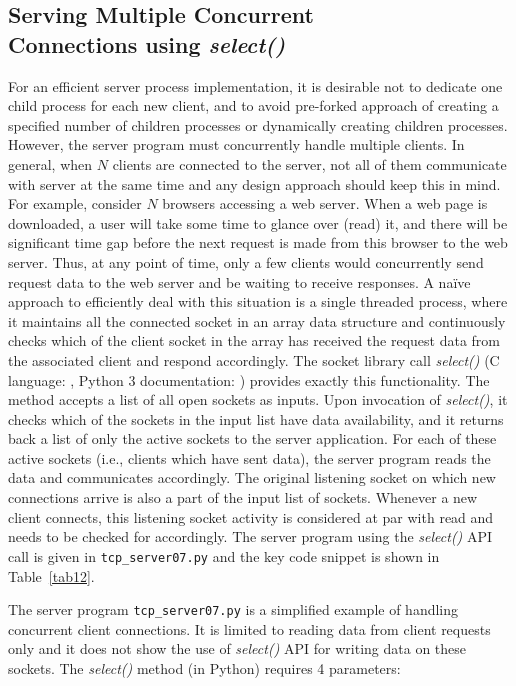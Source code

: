 \begin{multicols}{2}
\section{Serving Multiple Concurrent\\ Connections using \textit{select()}}

For an efficient server process implementation, it is desirable not to dedicate one child process for each new client, and to avoid pre-forked approach of creating a specified number of children processes or dynamically creating children processes. However, the server program must concurrently handle multiple clients. In general, when $N$ clients are connected to the server, not all of them communicate with server at the same time and any design approach should keep this in mind. For example, consider $N$ browsers accessing a web server. When a web page is downloaded, a user will take some time to glance over (read) it, and there will be significant time gap before the next request is made from this browser to the web server. Thus, at any point of time, only a few clients would concurrently send request data to the web server and be waiting to receive responses. A naïve approach to efficiently deal with this situation is a single threaded process, where it maintains all the connected socket in an array data structure and continuously checks which of the client socket in the array has received the request data from the associated client and respond accordingly. The socket library call \textit{select()} (C language: \cite{art1-key20}, Python 3 documentation: \cite{art1-key21}) provides exactly this functionality. The method accepts a list of all open sockets as inputs. Upon invocation of \textit{select()}, it checks which of the sockets in the input list have data availability, and it returns back a list of only the active sockets to the server application. For each of these active sockets (i.e., clients which have sent data), the server program reads the data and communicates accordingly. The original listening socket on which new connections arrive is also a part of the input list of sockets. Whenever a new client connects, this listening socket activity is considered at par with read and needs to be checked for accordingly. The server program using the \textit{select()} API call is given in \texttt{tcp\_server07.py} \cite{art1-key17} and the key code snippet is shown in Table~\ref{tab12}.

The server program \texttt{tcp\_server07.py} is a simplified example of handling concurrent client connections. It is limited to reading data from client requests only and it does not show the use of \textit{select()} API for writing data on these sockets. The \textit{select()} method (in Python) requires 4 parameters:


\end{multicols}
